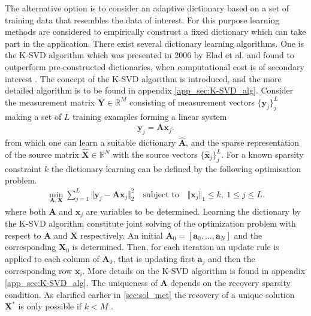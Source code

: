 The alternative option is to consider an adaptive dictionary based on a set of training data that resembles the data of interest. 
For this purpose learning methods are considered to empirically construct a fixed dictionary which can take part in the application. 
There exist several dictionary learning algorithms. One is the K-SVD algorithm which was presented in 2006 by Elad et al. and found to outperform pre-constructed dictionaries, when computational cost is of secondary interest \cite{Elad2006}. The concept of the K-SVD algorithm is introduced, and the more detailed algorithm is to be found in appendix \ref{app_sec:K-SVD_alg}. 
Consider the measurement matrix $\mathbf{Y} \in \mathbb{R}^M$ consisting of measurement vectors $\lbrace \mathbf{y}_j \rbrace_j^L$ making a set of $L$ training examples forming a linear system
\begin{align*}
\mathbf{y}_j = \mathbf{A} \mathbf{x}_j.
\end{align*}
from which one can learn a suitable dictionary $\hat{\mathbf{A}}$, and the sparse representation of the source matrix $\hat{\mathbf{X}} \in \mathbb{R}^N$ with the source vectors $\lbrace \hat{\mathbf{x}}_j \rbrace_j^L$.
For a known sparsity constraint $k$ the dictionary learning can be defined by the following optimisation problem. 
\begin{align}\label{eq:SVD1}
\min_{\mathbf{A}, \mathbf{X}} \sum_{j=1}^{L} \Vert \mathbf{y}_j - \mathbf{A} \mathbf{x}_j \Vert_2^2 \quad \text{subject to} \quad \Vert \textbf{x}_j \Vert_1 \leq k, \ 1 \leq j \leq L.
\end{align}
where both $\textbf{A}$ and $\textbf{x}_j$ are variables to be determined.  
Learning the dictionary by the K-SVD algorithm constitute joint solving of the optimization problem with respect to $\mathbf{A}$ and $\mathbf{X}$ respectively. An initial $\textbf{A}_0 = [\textbf{a}_0,\hdots,\textbf{a}_N]$ and the corresponding $\textbf{X}_0$ is determined. Then, for each iteration an update rule is applied to each column of $\textbf{A}_0$, that is updating first $\textbf{a}_j$ and then the corresponding row $\textbf{x}_i$. More details on the K-SVD algorithm is found in appendix \ref{app_sec:K-SVD_alg}. 
The uniqueness of $\mathbf{A}$ depends on the recovery sparsity condition. As clarified earlier in \ref{sec:sol_met} the recovery of a unique solution $\mathbf{X}^\ast$ is only possible if $k < M$ \cite{phd2015}.


